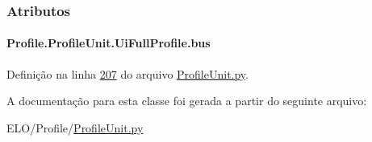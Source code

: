 \subsubsection{Atributos}
\hypertarget{classProfile_1_1ProfileUnit_1_1UiFullProfile_a47049f3f61c7fada93dd84fccd19a2bd}{
\paragraph[{bus}]{\setlength{\rightskip}{0pt plus 5cm}Profile.\-Profile\-Unit.\-Ui\-Full\-Profile.\-bus}}\label{classProfile_1_1ProfileUnit_1_1UiFullProfile_a47049f3f61c7fada93dd84fccd19a2bd}


Definição na linha \hyperlink{ProfileUnit_8py_source_l00207}{207} do arquivo \hyperlink{ProfileUnit_8py_source}{Profile\-Unit.\-py}.



A documentação para esta classe foi gerada a partir do seguinte arquivo\-:\begin{DoxyCompactItemize}
\item 
E\-L\-O/\-Profile/\hyperlink{ProfileUnit_8py}{Profile\-Unit.\-py}\end{DoxyCompactItemize}
